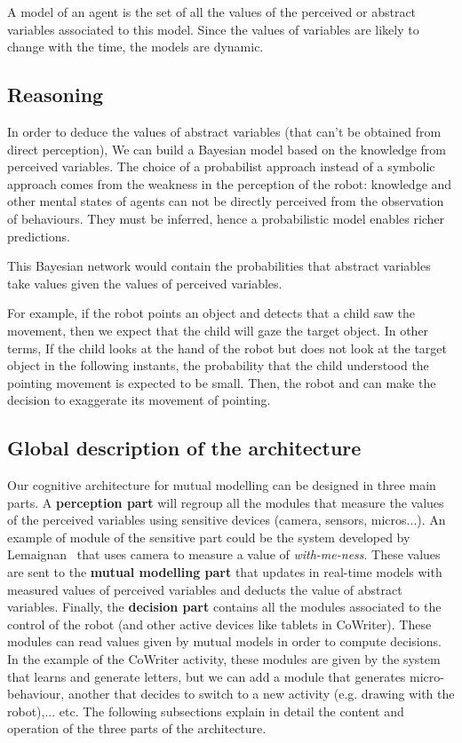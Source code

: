 \documentclass[conference]{IEEEtran}
\begin{document}
A model of an agent is the set of all the values of the perceived or abstract variables associated to this model. Since the values of variables are likely to change with the time, the models are dynamic.

\subsection{Reasoning}

In order to deduce the values of abstract variables (that can't be obtained from direct perception),
We can build a Bayesian model based on the knowledge from perceived variables. 
The choice of a probabilist approach instead of a symbolic approach comes from the weakness in
the perception of the robot: knowledge and other mental states of agents can not be directly 
perceived from the observation of behaviours. They must be inferred, hence a probabilistic model enables
richer predictions.

This Bayesian network would contain the probabilities that abstract variables take values given 
the values of perceived variables. 

For example, if the robot points an object and detects that a child saw the movement,
then we expect that the child will gaze the target object. In other terms, 
If the child looks at the hand of the robot but does not look at the target object in the following instants,  
the probability that the child understood the pointing movement is expected to be small.
Then, the robot and can make the decision to exaggerate its movement of pointing. 


\subsection{Global description of the architecture}

Our cognitive architecture for mutual modelling can be designed in three main parts. A \textbf{perception part} will regroup all the modules that measure the values of the perceived variables using sensitive devices (camera, sensors, micros...). An example of module of the sensitive part could be the system developed by Lemaignan~\cite{lemaignan2016realtime} that uses camera to measure a value of \textit{with-me-ness}. These values are sent to the \textbf{mutual modelling part} that updates in real-time models with measured values of perceived variables and deducts the value of abstract variables. Finally, the \textbf{decision part} contains all the modules associated to the control of the robot (and other active devices like tablets in CoWriter). These modules can read values given by mutual models in order to compute decisions. In the example of the CoWriter activity, these modules are given by the system that learns and generate letters, but we can add a module that generates micro-behaviour, another that decides to switch to a new activity (e.g. drawing with the robot),... etc. The following subsections explain in detail the content and operation of the three parts of the architecture. 
\end{document}
